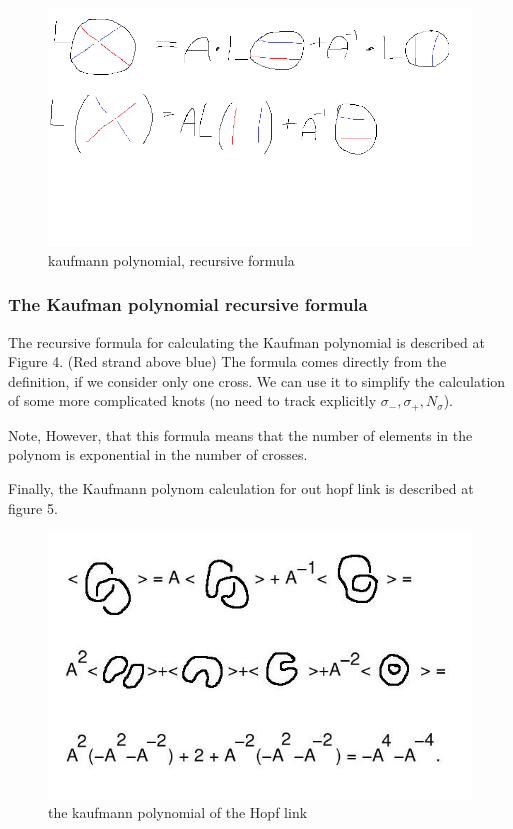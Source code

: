 \documentclass{article}
\begin{document}
\begin{figure}
\includegraphics[scale=0.2]{kauffman_bracket_identity} 
\caption{kaufmann polynomial, recursive formula}
\end{figure}

\subsubsection{The Kaufman polynomial recursive formula}

The recursive formula for calculating the Kaufman polynomial is described at Figure 4. (Red strand above blue)
The formula comes directly from the definition, if we consider only one cross. We can use it to simplify the calculation of some more complicated knots (no need to track explicitly  $\sigma_{-}, \sigma_{+}, N_{\sigma}$).

Note, However, that this formula means that the number of elements in the polynom is exponential in the number of crosses.

Finally, the Kaufmann polynom calculation for out hopf link is described at figure 5.
\begin{figure}
\includegraphics[scale=0.2]{hopf_link} 
\caption{the kaufmann polynomial of the Hopf link}
\end{figure}
\end{document}
